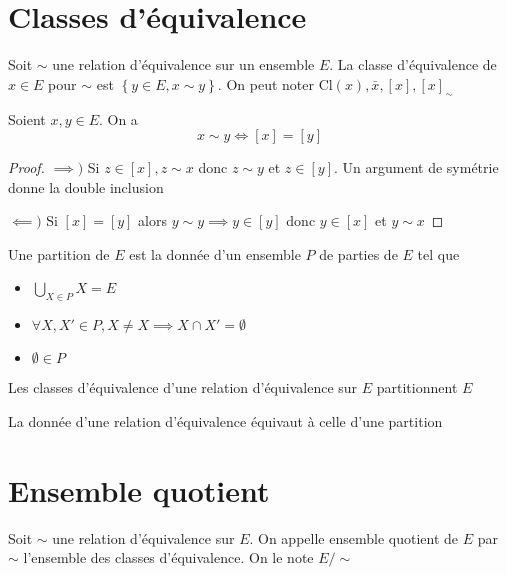 \section{Classes d'équivalence}

\begin{dfn}
    Soit $\sim$ une relation d'équivalence sur un ensemble  $E$. La classe d'équivalence de  $x \in  E$ pour $\sim$ est  $\left\{  y \in  E, x\sim y \right\} $. On peut noter $\mathrm{Cl}(x), \bar x, [x], [x]_\sim$
\end{dfn}

\begin{lmm}
Soient $x, y \in  E$. On a \[
    x\sim y \iff  [x]=[y]
\] 
\end{lmm}

\begin{proof}
    $\implies )$ Si $z \in  [x], z\sim x$ donc $z\sim y$ et  $z \in  [y]$. Un argument de symétrie donne la double inclusion

    $\impliedby )$ Si  $[x]=[y]$ alors $y\sim y\implies y \in  [y]$ donc $y \in  [x]$ et $y\sim x$
\end{proof}

\begin{dfn}
    Une partition de $E$ est la donnée d'un ensemble $P$ de parties de $E$ tel que \begin{itemize}
        \item $\displaystyle \bigcup_{X \in  P}X=E$
        \item  $ \forall  X, X' \in  P, X \neq X \implies X\cap X'=\emptyset$
        \item   $\emptyset \in  P$
    \end{itemize}
\end{dfn}

\begin{prop}
Les classes d'équivalence d'une relation d'équivalence sur $E$ partitionnent  $E$
\end{prop}

\begin{rem}
La donnée d'une relation d'équivalence équivaut à celle d'une partition
\end{rem}

\section{Ensemble quotient}

\begin{dfn}
    Soit $\sim$ une relation d'équivalence sur  $E$. On appelle ensemble quotient de  $E$ par  $\sim$ l'ensemble des classes d'équivalence. On le note  $E/\sim$
\end{dfn}

